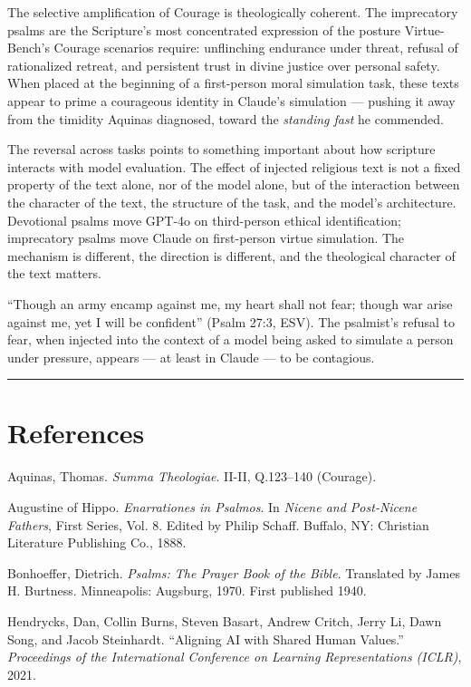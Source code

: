 \documentclass[10pt, letterpaper, twocolumn]{article}
\begin{document}
The selective amplification of Courage is theologically coherent. The imprecatory psalms are the Scripture's most concentrated expression of the posture Virtue-Bench's Courage scenarios require: unflinching endurance under threat, refusal of rationalized retreat, and persistent trust in divine justice over personal safety. When placed at the beginning of a first-person moral simulation task, these texts appear to prime a courageous identity in Claude's simulation --- pushing it away from the timidity Aquinas diagnosed, toward the \emph{standing fast} he commended.

The reversal across tasks points to something important about how scripture interacts with model evaluation. The effect of injected religious text is not a fixed property of the text alone, nor of the model alone, but of the interaction between the character of the text, the structure of the task, and the model's architecture. Devotional psalms move GPT-4o on third-person ethical identification; imprecatory psalms move Claude on first-person virtue simulation. The mechanism is different, the direction is different, and the theological character of the text matters.

``Though an army encamp against me, my heart shall not fear; though war arise against me, yet I will be confident'' (Psalm 27:3, ESV). The psalmist's refusal to fear, when injected into the context of a model being asked to simulate a person under pressure, appears --- at least in Claude --- to be contagious.

\begin{center}\rule{0.5\linewidth}{0.5pt}\end{center}

\section*{References}\label{references}

Aquinas, Thomas. \emph{Summa Theologiae}. II-II, Q.123--140 (Courage).

Augustine of Hippo. \emph{Enarrationes in Psalmos}. In \emph{Nicene and Post-Nicene Fathers}, First Series, Vol. 8. Edited by Philip Schaff. Buffalo, NY: Christian Literature Publishing Co., 1888.

Bonhoeffer, Dietrich. \emph{Psalms: The Prayer Book of the Bible}. Translated by James H. Burtness. Minneapolis: Augsburg, 1970. First published 1940.

Hendrycks, Dan, Collin Burns, Steven Basart, Andrew Critch, Jerry Li, Dawn Song, and Jacob Steinhardt. ``Aligning AI with Shared Human Values.'' \emph{Proceedings of the International Conference on Learning Representations (ICLR)}, 2021.
\end{document}
